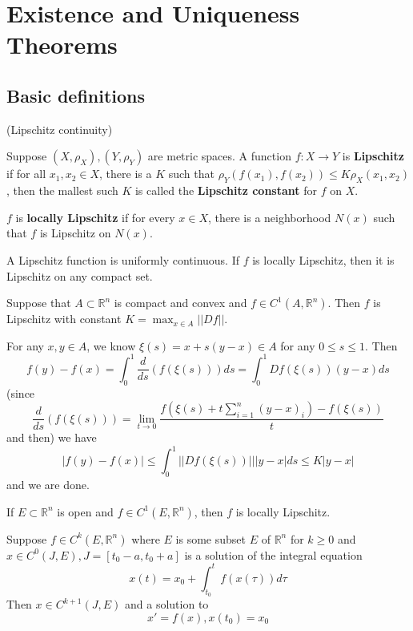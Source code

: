 \section{Existence and Uniqueness Theorems}

\subsection{Basic definitions}

\begin{definition}
    (Lipschitz continuity)\par
    Suppose $(X,\rho_X), (Y,\rho_Y)$ are metric spaces. A function $f:X\to Y$ is \textbf{Lipschitz} if for all $x_1,x_2\in X$, there is a $K$ such that $\rho_Y(f(x_1),f(x_2)) \leq K\rho_X(x_1,x_2)$, then the mallest such $K$ is called the \textbf{Lipschitz constant} for $f$ on $X$.\par
    $f$ is \textbf{locally Lipschitz} if for every $x\in X$, there is a neighborhood $N(x)$ such that $f$ is Lipschitz on $N(x)$.
\end{definition}

\begin{lemma}
    A Lipschitz function is uniformly continuous. If $f$ is locally Lipschitz, then it is Lipschitz on any compact set.
\end{lemma}

\begin{lemma}
    Suppose that $A\subset \mathbb{R}^n$ is compact and convex and $f\in C^1(A,\mathbb{R}^n)$. Then $f$ is Lipschitz with constant $K = \max_{x\in A}||Df||$.
\end{lemma}
\Pf\par
    For any $x,y\in A$, we know $\xi (s) = x+s(y-x) \in A$ for any $0\leq s \leq 1$. Then
    \[
    f(y)-f(x) = \int_0^1 \dfrac{d}{ds}(f(\xi(s)))ds = \int_0^1 Df(\xi(s))(y-x)ds
    \]
    (since
    \[
    \dfrac{d}{ds}(f(\xi(s))) = \lim_{t\to 0}\dfrac{f(\xi(s)+t\sum\limits_{i=1}^n (y-x)_i) - f(\xi(s))}{t}
    \]
    and then) we have
    \[
    |f(y)-f(x)| \leq \int_0^1 ||Df(\xi(s))|||y-x|ds \leq K|y-x|
    \]
    and we are done.

\begin{corollary}
    If $E\subset \mathbb{R}^n$ is open and $f\in C^1(E,\mathbb{R}^n)$, then $f$ is locally Lipschitz.
\end{corollary}

\begin{lemma}
    Suppose $f \in C^k(E,\mathbb{R}^n)$ where $E$ is some subset $E$ of $\mathbb{R}^n$ for $k\geq 0 $ and $x\in C^0(J,E), J = [t_0-a,t_0+a]$ is a solution of the integral equation
    \[
    x(t) = x_0 + \int_{t_0}^t f(x(\tau))d\tau
    \]
    Then $x\in C^{k+1}(J,E)$ and a solution to
    \[
    x' = f(x), x(t_0) = x_0
    \]
\end{lemma}
\Pf\par
    